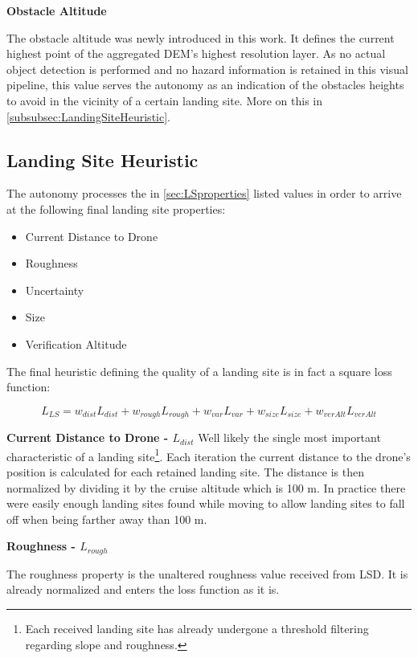 \textbf{Obstacle Altitude}\label{subsec:obstacle_altitude}

The obstacle altitude was newly introduced in this work. It defines the current highest point of the aggregated DEM's highest resolution layer. As no actual object detection is performed and no hazard information is retained in this visual pipeline, this value serves the autonomy as an indication of the obstacles heights to avoid in the vicinity of a certain landing site. More on this in \cref{subsubsec:LandingSiteHeuristic}.

\subsection{Landing Site Heuristic}

The autonomy processes the in \cref{sec:LSproperties} listed values in order to arrive at the following final landing site properties:

\begin{itemize}
    \item Current Distance to Drone
    \item Roughness
    \item Uncertainty
    \item Size
    \item Verification Altitude
\end{itemize}

The final heuristic defining the quality of a landing site is in fact a square loss function:

\begin{equation}
    L_{LS} = w_{dist}L_{dist} + w_{rough}L_{rough} + w_{var}L_{var} + w_{size}L_{size} + w_{verAlt}L_{verAlt}
    \label{eq:loss_fct}
\end{equation}

\textbf{Current Distance to Drone - $L_{dist}$}
Well likely the single most important characteristic of a landing site\footnote[1]{Each received landing site has already undergone a threshold filtering regarding slope and roughness.}. Each iteration the current distance to the drone's position is calculated for each retained landing site. The distance is then normalized by dividing it by the cruise altitude which is 100 m. In practice there were easily enough landing sites found while moving to allow landing sites to fall off when being farther away than 100 m.

\textbf{Roughness - $L_{rough}$}

The roughness property is the unaltered roughness value received from LSD. It is already normalized and enters the loss function as it is. 

